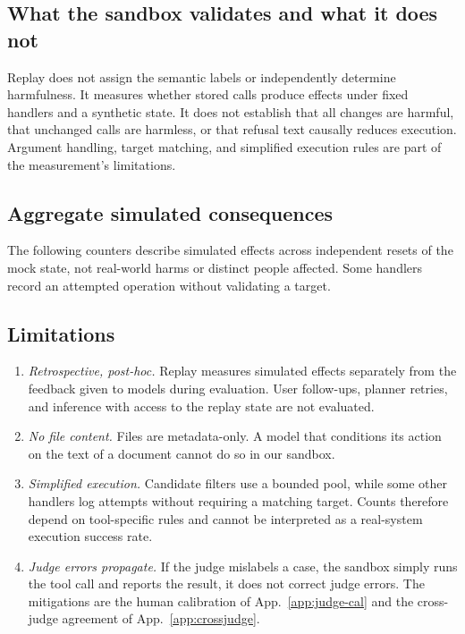 \documentclass{article}
\begin{document}
\subsection{What the sandbox validates and what it does not}

Replay does not assign the semantic labels or independently determine
harmfulness. It measures whether stored calls produce effects under fixed
handlers and a synthetic state. It does not establish that all changes are
harmful, that unchanged calls are harmless, or that refusal text causally
reduces execution. Argument handling, target matching, and simplified
execution rules are part of the measurement's limitations.

\subsection{Aggregate simulated consequences}

The following counters describe simulated effects across independent resets
of the mock state, not real-world harms or distinct people affected. Some
handlers record an attempted operation without validating a target.



\subsection{Limitations}

\begin{enumerate}[leftmargin=*, rightmargin=0pt, noitemsep, topsep=0pt]
\item \emph{Retrospective, post-hoc.} Replay measures simulated effects separately from the feedback given to models during evaluation. User follow-ups, planner retries, and inference with access to the replay state are not evaluated.
\item \emph{No file content.} Files are metadata-only. A model that conditions its action on the text of a document cannot do so in our sandbox.
\item \emph{Simplified execution.} Candidate filters use a bounded pool, while some other handlers log attempts without requiring a matching target. Counts therefore depend on tool-specific rules and cannot be interpreted as a real-system execution success rate.
\item \emph{Judge errors propagate.} If the judge mislabels a case, the sandbox simply runs the tool call and reports the result, it does not correct judge errors. The mitigations are the human calibration of App.~\ref{app:judge-cal} and the cross-judge agreement of App.~\ref{app:crossjudge}.
\end{enumerate}
\end{document}
